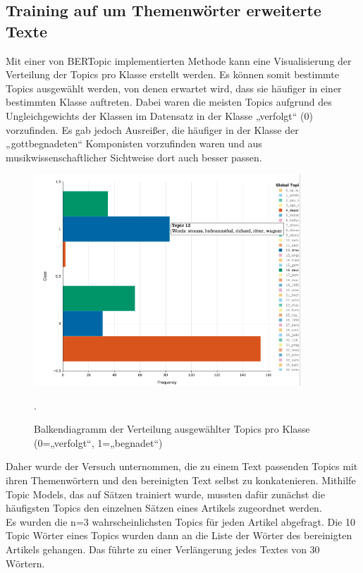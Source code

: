 \documentclass[ngerman]{ttlab-qualify}
\begin{document}
\subsection{Training auf um Themenwörter erweiterte Texte} \label{erweiterung_topics}
Mit einer von BERTopic implementierten Methode kann eine Visualisierung der Verteilung der Topics pro Klasse erstellt werden. Es können somit bestimmte Topics ausgewählt werden, von denen erwartet wird, dass sie häufiger in einer bestimmten Klasse auftreten. Dabei waren die meisten Topics aufgrund des Ungleichgewichts der Klassen im Datensatz in der Klasse „verfolgt“ (0) vorzufinden. Es gab jedoch Ausreißer, die häufiger in der Klasse der „gottbegnadeten“ Komponisten vorzufinden waren und aus musikwissenschaftlicher Sichtweise dort auch besser passen.
\begin{figure}[H]
\begin{center}
\includegraphics[width=10cm]{grafiken/topics_per_class.png}
\caption[Balkendiagramm der Verteilung ausgewählter Topics pro Klasse]{Balkendiagramm der Verteilung ausgewählter Topics pro Klasse (0=„verfolgt“, 1=„begnadet“)}.
\label{topics_per_class}
\end{center}
\end{figure}
\noindent Daher wurde der Versuch unternommen, die zu einem Text passenden Topics mit ihren Themenwörtern und den bereinigten Text selbst zu konkatenieren. Mithilfe Topic Models, das auf Sätzen trainiert wurde, mussten dafür zunächst die häufigsten Topics den einzelnen Sätzen eines Artikels zugeordnet werden.\\
Es wurden die n=3 wahrscheinlichsten Topics für jeden Artikel abgefragt. Die 10 Topic Wörter eines Topics wurden dann an die Liste der Wörter des bereinigten Artikels gehangen. Das führte zu einer Verlängerung jedes Textes von 30 Wörtern.
\end{document}
